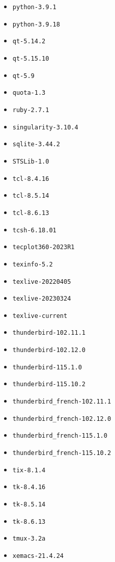 \begin{multicols}{3}
\begin{itemize}
\item \verb|python-3.9.1|
\item \verb|python-3.9.18|
\item \verb|qt-5.14.2|
\item \verb|qt-5.15.10|
\item \verb|qt-5.9|
\item \verb|quota-1.3|
\item \verb|ruby-2.7.1|
\item \verb|singularity-3.10.4|
\item \verb|sqlite-3.44.2|
\item \verb|STSLib-1.0|
\item \verb|tcl-8.4.16|
\item \verb|tcl-8.5.14|
\item \verb|tcl-8.6.13|
\item \verb|tcsh-6.18.01|
\item \verb|tecplot360-2023R1|
\item \verb|texinfo-5.2|
\item \verb|texlive-20220405|
\item \verb|texlive-20230324|
\item \verb|texlive-current|
\item \verb|thunderbird-102.11.1|
\item \verb|thunderbird-102.12.0|
\item \verb|thunderbird-115.1.0|
\item \verb|thunderbird-115.10.2|
\item \verb|thunderbird_french-102.11.1|
\item \verb|thunderbird_french-102.12.0|
\item \verb|thunderbird_french-115.1.0|
\item \verb|thunderbird_french-115.10.2|
\item \verb|tix-8.1.4|
\item \verb|tk-8.4.16|
\item \verb|tk-8.5.14|
\item \verb|tk-8.6.13|
\item \verb|tmux-3.2a|
\item \verb|xemacs-21.4.24|
\end{itemize}
\end{multicols}
\normalsize

